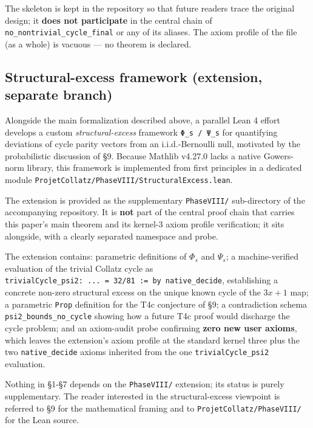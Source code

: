 \documentclass[
  11pt]{amsart}
\theoremstyle{plain}
\theoremstyle{definition}
\theoremstyle{remark}
\begin{document}
The skeleton is kept in the repository so that future readers trace the
original design; it \textbf{does not participate} in the central chain
of \texttt{no\_nontrivial\_cycle\_final} or any of its aliases. The
axiom profile of the file (as a whole) is vacuous --- no theorem is
declared.

\subsection{Structural-excess framework (extension, separate
branch)}\label{structural-excess-framework-extension-separate-branch}

Alongside the main formalization described above, a parallel Lean 4
effort develops a custom \emph{structural-excess} framework
\texttt{Φ\_s\ /\ Ψ\_s} for quantifying deviations of cycle parity
vectors from an i.i.d.-Bernoulli null, motivated by the probabilistic
discussion of §9. Because Mathlib v4.27.0 lacks a native Gowers-norm
library, this framework is implemented from first principles in a
dedicated module \texttt{ProjetCollatz/PhaseVIII/StructuralExcess.lean}.

The extension is provided as the supplementary \texttt{PhaseVIII/}
sub-directory of the accompanying repository. It is \textbf{not} part of
the central proof chain that carries this paper's main theorem and its
kernel-3 axiom profile verification; it sits alongside, with a clearly
separated namespace and probe.

The extension contains: parametric definitions of \(\Phi_s\) and
\(\Psi_s\); a machine-verified evaluation of the trivial Collatz cycle
as \texttt{trivialCycle\_psi2:\ ...\ =\ 32/81\ :=\ by\ native\_decide},
establishing a concrete non-zero structural excess on the unique known
cycle of the \(3x+1\) map; a parametric \texttt{Prop} definition for the
T4c conjecture of §9; a contradiction schema
\texttt{psi2\_bounds\_no\_cycle} showing how a future T4c proof would
discharge the cycle problem; and an axiom-audit probe confirming
\textbf{zero new user axioms}, which leaves the extension's axiom
profile at the standard kernel three plus the two
\texttt{native\_decide} axioms inherited from the one
\texttt{trivialCycle\_psi2} evaluation.

Nothing in §1-§7 depends on the \texttt{PhaseVIII/} extension; its
status is purely supplementary. The reader interested in the
structural-excess viewpoint is referred to §9 for the mathematical
framing and to \texttt{ProjetCollatz/PhaseVIII/} for the Lean source.
\end{document}
